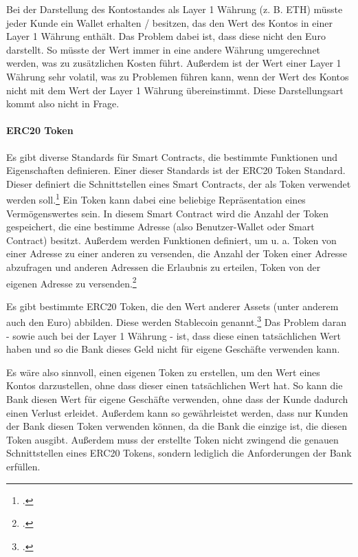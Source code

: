 \documentclass[12pt, a4paper]{article}
\begin{document}
{\noindent
Bei der Darstellung des Kontostandes als Layer 1 Währung (z. B. ETH) müsste jeder Kunde ein Wallet erhalten / besitzen, das den Wert des Kontos in einer Layer 1 Währung enthält.
Das Problem dabei ist, dass diese nicht den Euro darstellt. 
So müsste der Wert immer in eine andere Währung umgerechnet werden, was zu zusätzlichen Kosten führt. Außerdem ist der Wert einer Layer 1 Währung sehr volatil, was zu Problemen führen kann, wenn der Wert des Kontos nicht mit dem Wert der Layer 1 Währung übereinstimmt.
Diese Darstellungsart kommt also nicht in Frage.

\paragraph{ERC20 Token}
Es gibt diverse Standards für Smart Contracts, die bestimmte Funktionen und Eigenschaften definieren.
Einer dieser Standards ist der ERC20 Token Standard. Dieser definiert die Schnittstellen eines Smart Contracts, der als Token verwendet werden soll.\footcite[Vgl. hierzu und zum Folgenden][]{w7}
Ein Token kann dabei eine beliebige Repräsentation eines Vermögenswertes sein.
In diesem Smart Contract wird die Anzahl der Token gespeichert, die eine bestimme Adresse (also Benutzer-Wallet oder Smart Contract) besitzt.
Außerdem werden Funktionen definiert, um u. a. Token von einer Adresse zu einer anderen zu versenden, die Anzahl der Token einer Adresse abzufragen und anderen Adressen die Erlaubnis zu erteilen, Token von der eigenen Adresse zu versenden.\footcites[Vgl.][]{w8}[]{w7}

\bigbreak
\noindent
Es gibt bestimmte ERC20 Token, die den Wert anderer Assets (unter anderem auch den Euro) abbilden. Diese werden Stablecoin genannt.\footcite[Vgl. hierzu und weiterführend][4]{q8}
Das Problem daran - sowie auch bei der Layer 1 Währung - ist, dass diese einen tatsächlichen Wert haben und so die Bank dieses Geld nicht für eigene Geschäfte verwenden kann.

\bigbreak
{}
\label{datenspeicherung:neuer-token}
\noindent
Es wäre also sinnvoll, einen eigenen Token zu erstellen, um den Wert eines Kontos darzustellen, ohne dass dieser einen tatsächlichen Wert hat. So kann die Bank diesen Wert für eigene Geschäfte verwenden, ohne dass der Kunde dadurch einen Verlust erleidet. 
Außerdem kann so gewährleistet werden, dass nur Kunden der Bank diesen Token verwenden können, da die Bank die einzige ist, die diesen Token ausgibt.
Außerdem muss der erstellte Token nicht zwingend die genauen Schnittstellen eines ERC20 Tokens, sondern lediglich die Anforderungen der Bank erfüllen.
}
\end{document}
